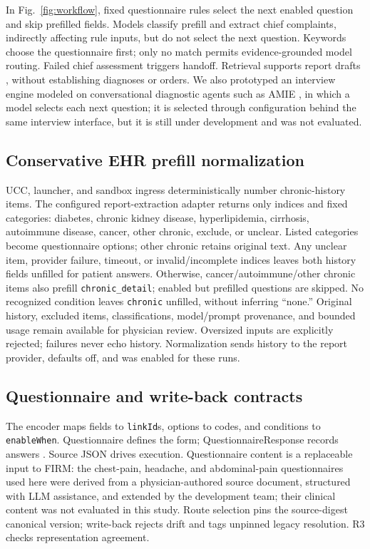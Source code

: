 \documentclass[lineno,pdflatex,sn-basic]{sn-jnl}%
\theoremstyle{thmstyleone}%
\theoremstyle{thmstyletwo}%
\theoremstyle{thmstylethree}%
\begin{document}
In Fig.~\ref{fig:workflow}, fixed questionnaire rules select the next enabled
question and skip prefilled fields. Models classify prefill and extract chief
complaints, indirectly affecting rule inputs, but do not select the next question.
Keywords choose the questionnaire first; only no match permits evidence-grounded
model routing. Failed chief assessment triggers handoff. Retrieval supports report
drafts \citep{lewisRag2020}, without establishing diagnoses or orders. We also
prototyped an interview engine modeled on conversational diagnostic agents such as
AMIE \citep{tuConversationalDiagnosticArtificial2025}, in which a model selects each
next question; it is selected through configuration behind the same interview
interface, but it is still under development and was not evaluated.

\subsection{Conservative EHR prefill normalization}
UCC, launcher, and sandbox ingress deterministically number chronic-history items.
The configured report-extraction adapter returns only indices and fixed categories:
diabetes, chronic kidney disease, hyperlipidemia, cirrhosis, autoimmune disease, cancer,
other chronic, exclude, or unclear. Listed categories become questionnaire options;
other chronic retains original text. Any unclear item, provider failure, timeout,
or invalid/incomplete indices leaves both history fields unfilled for patient
answers. Otherwise, cancer/autoimmune/other chronic items also prefill
\texttt{chronic\_detail}; enabled but prefilled questions are skipped. No recognized
condition leaves \texttt{chronic} unfilled, without inferring ``none.'' Original
history, excluded items, classifications, model/prompt provenance, and bounded
usage remain available for physician review. Oversized inputs are explicitly
rejected; failures never echo history. Normalization sends history to the report
provider, defaults off, and was enabled for these runs.

\subsection{Questionnaire and write-back contracts}
The encoder maps fields to \texttt{linkId}s, options to codes, and conditions to
\texttt{enableWhen}. Questionnaire defines the form; QuestionnaireResponse records
answers \citep{fhirQuestionnaireR4,sdcIG}. Source JSON drives execution.
Questionnaire content is a replaceable input to FIRM: the chest-pain, headache, and
abdominal-pain questionnaires used here were derived from a physician-authored
source document, structured with LLM assistance, and extended by the development
team; their clinical content was not evaluated in this study. Route
selection pins the source-digest canonical version; write-back rejects drift and
tags unpinned legacy resolution. R3 checks representation agreement.
\end{document}
